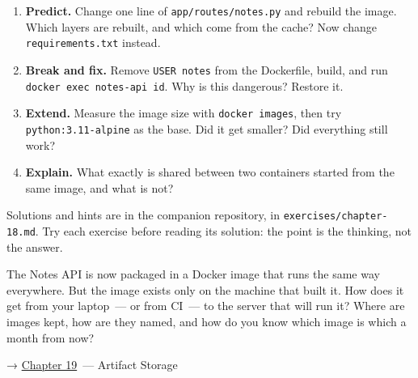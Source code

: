 \label{18-containerization:exercises}

\begin{enumerate}
\def\labelenumi{\arabic{enumi}.}
\tightlist
\item
  \textbf{Predict.} Change one line of \texttt{app/}\allowbreak{}\texttt{routes/}\allowbreak{}\texttt{notes.py} and rebuild the image. Which layers are rebuilt, and which come from the cache? Now change \texttt{requirements.txt} instead.
\item
  \textbf{Break and fix.} Remove \texttt{USER\ notes} from the Dockerfile, build, and run \texttt{docker\ exec\ notes-}\allowbreak{}\texttt{api\ id}. Why is this dangerous? Restore it.
\item
  \textbf{Extend.} Measure the image size with \texttt{docker\ images}, then try \texttt{python:3.11-alpine} as the base. Did it get smaller? Did everything still work?
\item
  \textbf{Explain.} What exactly is shared between two containers started from the same image, and what is not?
\end{enumerate}

\noindent{}Solutions and hints are in the companion repository, in \texttt{exercises/}\allowbreak{}\texttt{chapter-18.md}. Try each exercise before reading its solution: the point is the thinking, not the answer.

\label{18-containerization:whats-next}

The Notes API is now packaged in a Docker image that runs the same way everywhere. But the image exists only on the machine that built it. How does it get from your laptop~--- or from CI~--- to the server that will run it? Where are images kept, how are they named, and how do you know which image is which a month from now?

\noindent{}→ \hyperref[ch:19-artifact-storage]{Chapter 19}~--- Artifact Storage
